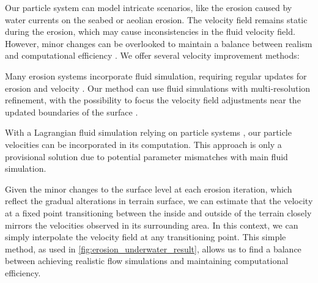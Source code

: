 Our particle system can model intricate scenarios, like the erosion caused by water currents on the seabed or aeolian erosion. The velocity field remains static during the erosion, which may cause inconsistencies in the fluid velocity field. However, minor changes can be overlooked to maintain a balance between realism and computational efficiency \cite{Tychonievich2010}. We offer several velocity improvement methods: 
\begin{Itemize}
     Many erosion systems incorporate fluid simulation, requiring regular updates for erosion and velocity \cite{Kristof2009, Wojtan2007}. Our method can use fluid simulations with multi-resolution refinement, with the possibility to focus the velocity field adjustments near the updated boundaries of the surface \cite{Roose2011}. 
    
     With a Lagrangian fluid simulation relying on particle systems \cite{Koschier2022}, our particle velocities can be incorporated in its computation. This approach is only a provisional solution due to potential parameter mismatches with main fluid simulation. 

     Given the minor changes to the surface level at each erosion iteration, which reflect the gradual alterations in terrain surface, we can estimate that the velocity at a fixed point transitioning between the inside and outside of the terrain closely mirrors the velocities observed in its surrounding area. In this context, we can simply interpolate the velocity field at any transitioning point. This simple method, as used in \cref{fig:erosion_underwater_result}, allows us to find a balance between achieving realistic flow simulations and maintaining computational efficiency.
\end{Itemize}
